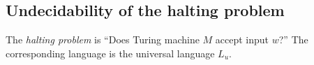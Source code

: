 

\setcounter{section}{8}
\setcounter{subsection}{5}
\setcounter{dfn}{7}

\subsection{Undecidability of the halting problem}
The \emph{halting problem} is ``Does Turing machine $M$ accept input $w$?''
The corresponding language is the universal language $L_u$.


